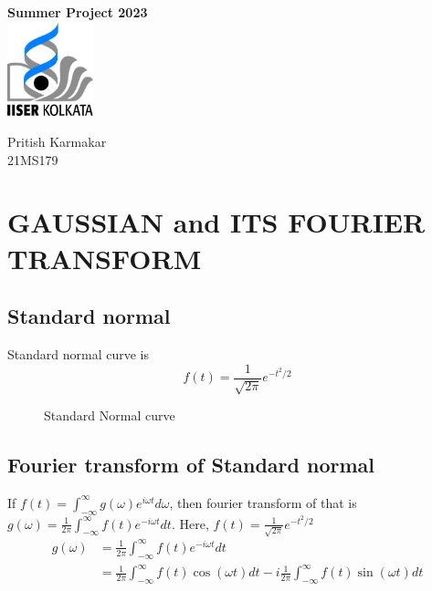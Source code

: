 \documentclass[11pt,a4paper]{article}
\author{Pritish Karmakar}
\begin{document}
	\begin{titlepage}
		\vspace*{3.5cm}
		\centering
		{\Huge\bfseries Summer Project 2023}\\
		\vspace{5cm}
		\includegraphics[width=2.5cm]{iiserk.png}
		
		\vspace{5cm}
		
		{\LARGE Pritish Karmakar\\}
		\vspace{0.3cm}
		{21MS179}
		\vfill
		
		
		\clearpage
		\tableofcontents
		\clearpage
		\lstlistoflistings
	\end{titlepage}
	
\section{GAUSSIAN and ITS FOURIER TRANSFORM}

\subsection{Standard normal}
Standard normal curve is $$f(t)=\frac{1}{\sqrt{2\pi}}e^{-t^2 /2}$$

\begin{figure}[ht]
	\centering
	\scalebox{1}{}
	\caption{Standard Normal curve}
	\label{fig:gaussian}
\end{figure}


\subsection{Fourier transform of Standard normal}
If $f(t)=\int_{-\infty}^{\infty}g(\omega)e^{i\omega t} d\omega$, then fourier transform of that is $g(\omega)=\frac{1}{2\pi}\int_{-\infty}^{\infty}f(t)e^{-i\omega t} dt$. Here, $f(t)=\frac{1}{\sqrt{2\pi}}e^{-t^2 /2}$\\

\begin{align*}
	g(\omega)&=\frac{1}{2\pi}\int_{-\infty}^{\infty}f(t)e^{-i\omega t} dt\\
	&=\frac{1}{2\pi}\int_{-\infty}^{\infty}f(t)\cos(\omega t) dt - i \frac{1}{2\pi}\int_{-\infty}^{\infty}f(t)\sin(\omega t) dt
\end{align*}
\end{document}
